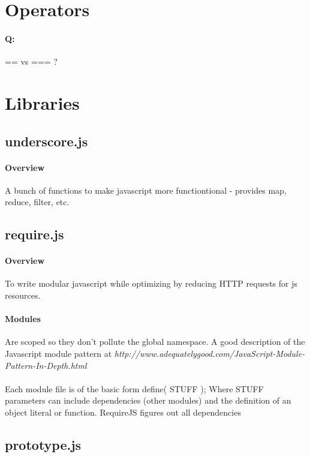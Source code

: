 \documentclass[11pt]{article} %
\begin{document}
\section{Operators}

\paragraph{Q:} == vs === ?

\section{Libraries}

\subsection{underscore.js}

\paragraph{Overview} A bunch of functions to make javascript more functiontional - provides map, reduce,
filter, etc.

\subsection{require.js}

\paragraph{Overview} To write modular javascript while optimizing by reducing HTTP requests for js
resources.

\paragraph{Modules} Are scoped so they don't pollute the global namespace. A good description of the
Javascript module pattern at \emph{http://www.adequatelygood.com/JavaScript-Module-Pattern-In-Depth.html}

\paragraph{} Each module file is of the basic form define( STUFF ); Where STUFF parameters can include 
dependencies (other modules) and the definition of an object literal or function. RequireJS figures out all
dependencies


\subsection{prototype.js}
\end{document}
